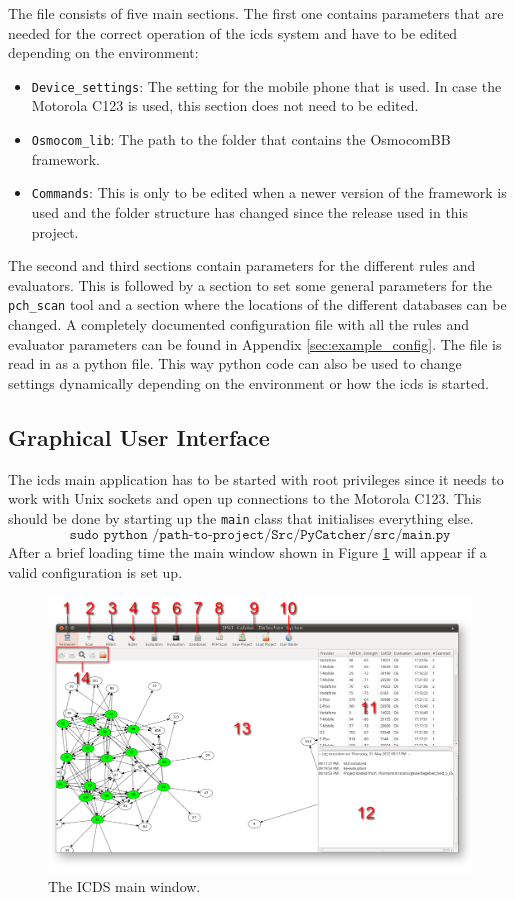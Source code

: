 The file consists of five main sections.
The first one contains parameters that are needed for the correct operation of the \gls{icds} system and have to be edited depending on the environment:
\begin{itemize}
	\item \texttt{Device\_settings}: The setting for the mobile phone that is used.
	In case the Motorola C123 is used, this section does not need to be edited.
	\item \texttt{Osmocom\_lib}: The path to the folder that contains the OsmocomBB framework.
	\item \texttt{Commands}: This is only to be edited when a newer version of the framework is used and the folder structure has changed since the release used in this project.
\end{itemize}
The second and third sections contain parameters for the different rules and evaluators.
This is followed by a section to set some general parameters for the \texttt{pch\_scan} tool and a section where the locations of the different databases can be changed.
A completely documented configuration file with all the rules and evaluator parameters can be found in Appendix \ref{sec:example_config}.
The file is read in as a python file.
This way python code can also be used to change settings dynamically depending on the environment or how the \gls{icds} is started.

\subsection{Graphical User Interface}
\label{sec:icds_operation}
The \gls{icds} main application has to be started with root privileges since it needs to work with Unix sockets and open up connections to the Motorola C123.
This should be done by starting up the \texttt{main} class that initialises everything else.
\[\texttt{sudo python /path-to-project/Src/PyCatcher/src/main.py}\]
After a brief loading time the main window shown in Figure \ref{fig:icds} will appear if a valid configuration is set up.

\begin{figure}
\centering
\includegraphics[width=\textwidth]{../Images/ICDS}
\caption{The ICDS main window.}
\label{fig:icds}
\end{figure}

